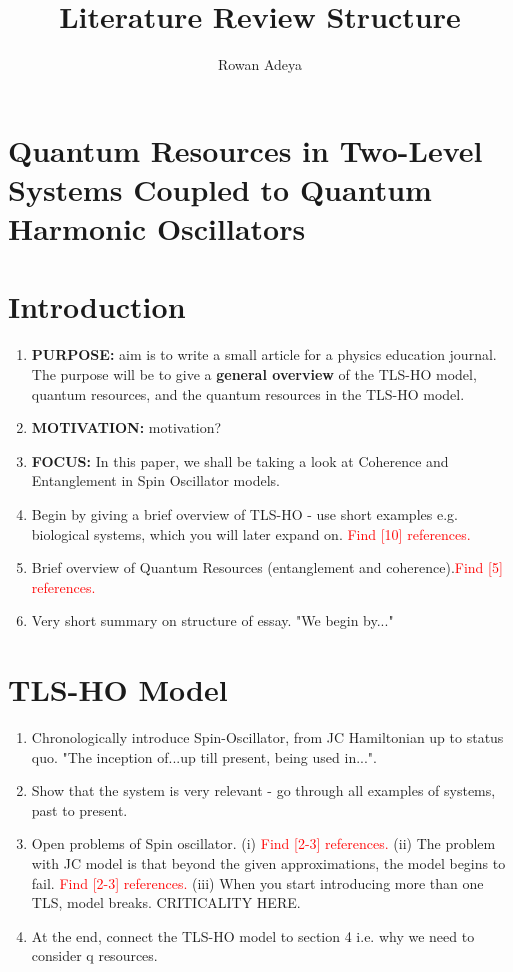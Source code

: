 \documentclass{article}
\title{Literature Review Structure}
\author{Rowan Adeya}
\date{ }
\begin{document}
\maketitle

\tableofcontents

\newpage

\section{Quantum Resources in Two-Level Systems Coupled to Quantum Harmonic Oscillators}

\section{Introduction}

\begin{enumerate}
    \item \textbf{PURPOSE:} aim is to write a small article for a physics education journal. The purpose will be to give a \textbf{general overview} of the TLS-HO model, quantum resources, and the quantum resources in the TLS-HO model.
    \item \textbf{MOTIVATION:} motivation?
    \item \textbf{FOCUS:} In this paper, we shall be taking a look at Coherence and Entanglement in Spin Oscillator models. 
    \item Begin by giving a brief overview of TLS-HO - use short examples e.g. biological systems, which you will later expand on. \textcolor{red}{Find [10] references.}
    \item Brief overview of Quantum Resources (entanglement and coherence).\textcolor{red}{Find [5] references.}
    \item Very short summary on structure of essay. "We begin by..."
\end{enumerate}


\section{TLS-HO Model}
\begin{enumerate}
    \item Chronologically introduce Spin-Oscillator, from JC Hamiltonian up to status quo. "The inception of...up till present, being used in...".
    \item Show that the system is very relevant - go through all examples of systems, past to present.
    \item Open problems of Spin oscillator. 
    \subitem (i) \textcolor{red}{Find [2-3] references.}
    \subitem (ii) The problem with JC model is that beyond the given approximations, the model begins to fail. \textcolor{red}{Find [2-3] references.}
    \subitem (iii) When you start introducing more than one TLS, model breaks. CRITICALITY HERE.
    \item At the end, connect the TLS-HO model to section 4 i.e. why we need to consider q resources.
\end{enumerate}
\end{document}

